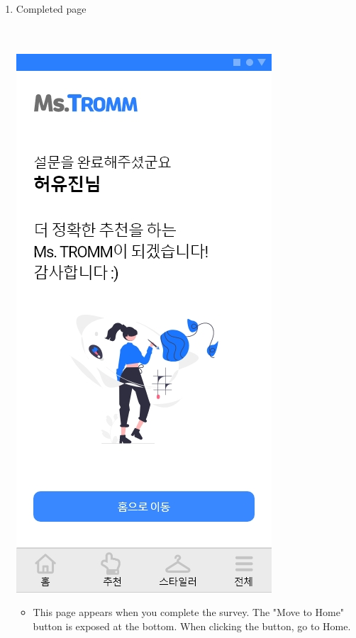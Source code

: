 \documentclass[conference]{IEEEtran}
\begin{document}
\begin{enumerate}
\begin{enumerate}
\begin{itemize}
        \end{itemize} 
         \break
    \item Completed page \\ \\ \\
    \centerline{\includegraphics[scale=0.32]{5-5. 설문 종료.jpg}}
    \begin{itemize}
        \item[] This page appears when you complete the survey. The "Move to Home" button is exposed at the bottom. When clicking the button, go to Home.\\ \\ \\ \\
        \end{itemize} 

\end{enumerate}
\end{enumerate}
\end{document}
